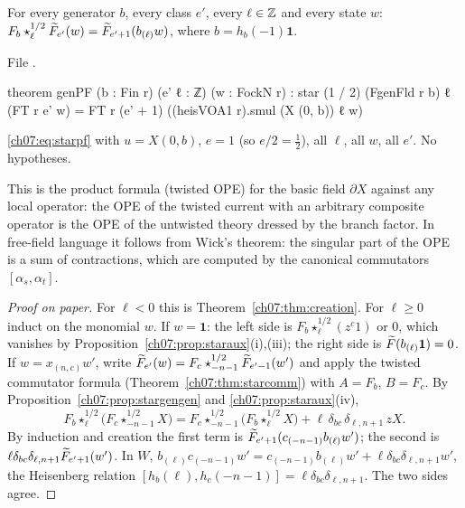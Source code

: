 \begin{theorem}\label{ch07:thm:genPF}
For every generator $b$, every class $e'$, every $\ell\in{\mathbb{Z}}$ and every state $w$:
$F_b\star^{1/2}_\ell\widetilde{F}_{e'}(w) = \widetilde{F}_{e'+1}(b_{(\ell)}w)$, where $b = h_b(-1)\mathbf 1$.
\end{theorem}

\noindent File .
\begin{leancode}
theorem genPF (b : Fin r) (e' ℓ : ℤ) (w : FockN r) :
    star (1 / 2) (FgenFld r b) ℓ (FT r e' w)
      = FT r (e' + 1) ((heisVOA1 r).smul (X (0, b)) ℓ w)
\end{leancode}

\begin{dictionary}
\eqref{ch07:eq:starpf} with $u = X(0,b)$, $e=1$ (so $e/2 = \frac12$), all $\ell$, all $w$, all
$e'$. No hypotheses.
\end{dictionary}

\begin{physics}
This is the product formula (twisted OPE) for the basic field $\partial X$ against any local operator: the OPE of the twisted current with an arbitrary composite operator is the OPE of the untwisted theory dressed by the branch factor. In free-field language it follows from Wick's theorem: the singular part of the OPE is a sum of contractions, which are computed by the canonical commutators $[\alpha_s,\alpha_t]$.
\end{physics}

\begin{proof}[Proof on paper]
For $\ell<0$ this is Theorem~\ref{ch07:thm:creation}. For $\ell\ge0$ induct on the monomial $w$.
If $w = \mathbf 1$: the left side is $F_b\star^{1/2}_\ell(z^c1)$ or $0$, which vanishes by
Proposition~\ref{ch07:prop:staraux}(i),(iii); the right side is $\widetilde{F}(b_{(\ell)}\mathbf 1) =
0$. If $w = x_{(n,c)}w'$, write $\widetilde{F}_{e'}(w) = F_c\star^{1/2}_{-n-1}\widetilde{F}_{e'-1}(w')$
and apply the twisted commutator formula (Theorem~\ref{ch07:thm:starcomm}) with $A = F_b$,
$B = F_c$. By Proposition~\ref{ch07:prop:stargengen} and \ref{ch07:prop:staraux}(iv),
\begin{equation*}
  F_b\star^{1/2}_\ell\bigl(F_c\star^{1/2}_{-n-1}X\bigr) = F_c\star^{1/2}_{-n-1}\bigl(F_b
  \star^{1/2}_\ell X\bigr) + \ell\,\delta_{bc}\,\delta_{\ell,n+1}\,zX.
\end{equation*}
By induction and creation the first term is $\widetilde{F}_{e'+1}(c_{(-n-1)}b_{(\ell)}w')$; the second
is $\ell\delta_{bc}\delta_{\ell,n+1}\widetilde{F}_{e'+1}(w')$. In $W$,
$b_{(\ell)}c_{(-n-1)}w' = c_{(-n-1)}b_{(\ell)}w' + \ell\delta_{bc}\delta_{\ell,n+1}w'$, the
Heisenberg relation $[h_b(\ell),h_c(-n-1)] = \ell\delta_{bc}\delta_{\ell,n+1}$. The two sides agree.
\end{proof}

